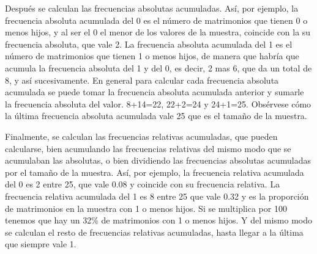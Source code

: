 \begin{frame}
{Después se calculan las frecuencias absolutas acumuladas. Así, por ejemplo, la frecuencia absoluta acumulada del 0 es
el número de matrimonios que tienen 0 o menos hijos, y al ser el 0 el menor de los valores de la muestra, coincide con
la su frecuencia absoluta, que vale 2. La frecuencia absoluta acumulada del 1 es el número de matrimonios que tienen 1
o menos hijos, de manera que habría que acumula la frecuencia absoluta del 1 y del 0, es decir, 2 mas 6, que da un
total de 8, y así sucesivamente. En general para calcular cada frecuencia absoluta acumulada se puede tomar la
frecuencia absoluta acumulada anterior y sumarle la frecuencia absoluta del valor. 8+14=22, 22+2=24 y 24+1=25.
Obsérvese cómo la última frecuencia absoluta acumulada vale 25 que es el tamaño de la muestra.

Finalmente, se calculan las frecuencias relativas acumuladas, que pueden calcularse, bien acumulando las frecuencias
relativas del mismo modo que se acumulaban las absolutas, o bien dividiendo las frecuencias absolutas acumuladas por el
tamaño de la muestra. Así, por ejemplo, la frecuencia relativa acumulada del 0 es 2 entre 25, que vale 0.08 y coincide
con su frecuencia relativa. La frecuencia relativa acumulada del 1 es 8 entre 25 que vale 0.32 y es la proporción de
matrimonios en la muestra con 1 o menos hijos. Si se multiplica por 100 tenemos que hay un 32\% de matrimonios con 1 o
menos hijos. Y del mismo modo se calculan el resto de frecuencias relativas acumuladas, hasta llegar a la última que
siempre vale 1.
}
\end{frame}


